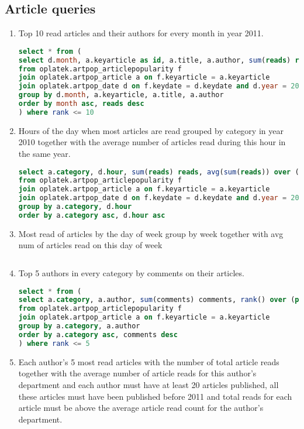\subsection*{Article queries} %
\label{sub:Article  queries}
\begin{enumerate}
\item    Top 10 read articles and their authors for every month in year 2011.
\begin{lstlisting}[language=sql] 
select * from (
select d.month, a.keyarticle as id, a.title, a.author, sum(reads) reads, rank() over (partition by month order by sum(reads) desc) rank 
from oplatek.artpop_articlepopularity f
join oplatek.artpop_article a on f.keyarticle = a.keyarticle
join oplatek.artpop_date d on f.keydate = d.keydate and d.year = 2010
group by d.month, a.keyarticle, a.title, a.author
order by month asc, reads desc
) where rank <= 10
\end{lstlisting}
\item    Hours of the day when most articles are read grouped by category in year 2010 together with the average number of articles read during this hour in the same year.
\begin{lstlisting}[language=sql] 
select a.category, d.hour, sum(reads) reads, avg(sum(reads)) over (partition by hour) avg_reads 
from oplatek.artpop_articlepopularity f
join oplatek.artpop_article a on f.keyarticle = a.keyarticle
join oplatek.artpop_date d on f.keydate = d.keydate and d.year = 2010
group by a.category, d.hour
order by a.category asc, d.hour asc
\end{lstlisting}
\item    Most read of articles by the day of week group by week together with avg num of articles read on this day of week
\begin{lstlisting}[language=sql] 
\end{lstlisting}
\item    Top 5 authors in every category by comments on their articles.
\begin{lstlisting}[language=sql] 
select * from (
select a.category, a.author, sum(comments) comments, rank() over (partition by a.category order by sum(comments) desc) rank 
from oplatek.artpop_articlepopularity f
join oplatek.artpop_article a on f.keyarticle = a.keyarticle
group by a.category, a.author
order by a.category asc, comments desc
) where rank <= 5
\end{lstlisting}
\item    Each author's 5 most read articles with the number of total article reads together with the average number of article reads for this author's department and each author must have at least 20 articles published, all these articles must have been published before 2011 and total reads for each article must be above the average article read count for the author's department.

\end{enumerate}
